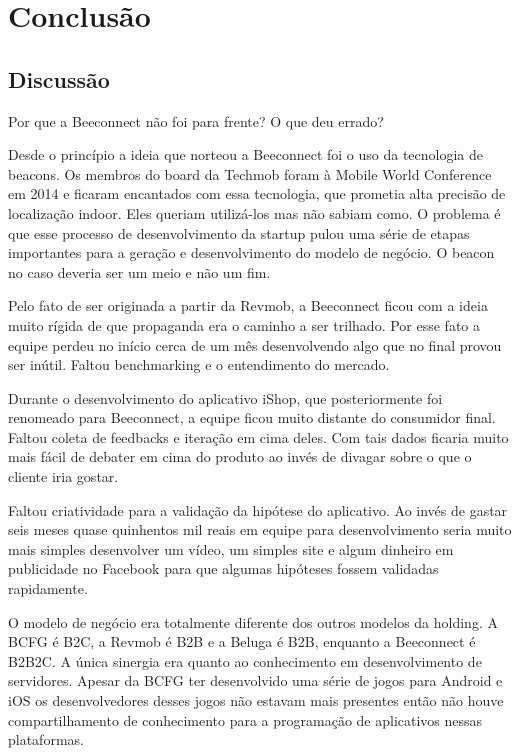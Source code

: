 \chapter{Conclusão}

\section{Discussão} %
\label{sec:discussao}
Por que a Beeconnect não foi para frente? O que deu errado?

Desde o princípio a ideia que norteou a Beeconnect foi o uso da tecnologia de beacons. Os membros do board da Techmob foram à Mobile World Conference em 2014 e ficaram encantados com essa tecnologia, que prometia alta precisão de localização indoor. Eles queriam utilizá-los mas não sabiam como. O problema é que esse processo de desenvolvimento da startup pulou uma série de etapas importantes para a geração e desenvolvimento do modelo de negócio. O beacon no caso deveria ser um meio e não um fim.

Pelo fato de ser originada a partir da Revmob, a Beeconnect ficou com a ideia muito rígida de que propaganda era o caminho a ser trilhado. Por esse fato a equipe perdeu no início cerca de um mês desenvolvendo algo que no final provou ser inútil. Faltou benchmarking e o entendimento do mercado.

Durante o desenvolvimento do aplicativo iShop, que posteriormente foi renomeado para Beeconnect, a equipe ficou muito distante do consumidor final. Faltou coleta de feedbacks e iteração em cima deles. Com tais dados ficaria muito mais fácil de debater em cima do produto ao invés de divagar sobre o que o cliente iria gostar.

Faltou criatividade para a validação da hipótese do aplicativo. Ao invés de gastar seis meses quase quinhentos mil reais em equipe para desenvolvimento seria muito mais simples desenvolver um vídeo, um simples site e algum dinheiro em publicidade no Facebook para que algumas hipóteses fossem validadas rapidamente.

O modelo de negócio era totalmente diferente dos outros modelos da holding. A BCFG é B2C, a Revmob é B2B e a Beluga é B2B, enquanto a Beeconnect é B2B2C. A única sinergia era quanto ao conhecimento em desenvolvimento de servidores. Apesar da BCFG ter desenvolvido uma série de jogos para Android e iOS os desenvolvedores desses jogos não estavam mais presentes então não houve compartilhamento de conhecimento para a programação de aplicativos nessas plataformas.

